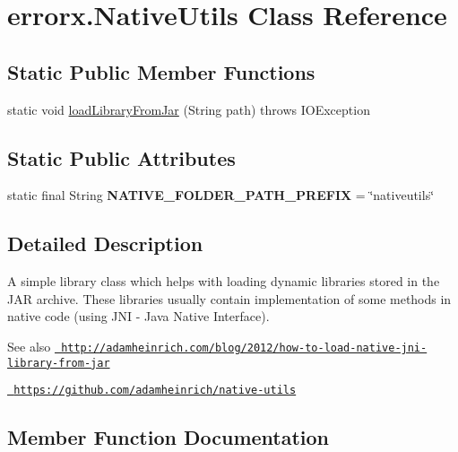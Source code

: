 \hypertarget{classerrorx_1_1_native_utils}{}\section{errorx.\+Native\+Utils Class Reference}
\label{classerrorx_1_1_native_utils}
\subsection*{Static Public Member Functions}
\begin{DoxyCompactItemize}
\item 
static void \mbox{\hyperlink{classerrorx_1_1_native_utils_a673add9b19469f2d436ed69a12bd1360}{load\+Library\+From\+Jar}} (String path)  throws I\+O\+Exception 
\end{DoxyCompactItemize}
\subsection*{Static Public Attributes}
\begin{DoxyCompactItemize}
\item 
\mbox{\label{classerrorx_1_1_native_utils_ae5420a210f1d41fb2d8a00a6883476ea}} 
static final String {\bfseries N\+A\+T\+I\+V\+E\+\_\+\+F\+O\+L\+D\+E\+R\+\_\+\+P\+A\+T\+H\+\_\+\+P\+R\+E\+F\+IX} = \char`\"{}nativeutils\char`\"{}
\end{DoxyCompactItemize}


\subsection{Detailed Description}
A simple library class which helps with loading dynamic libraries stored in the J\+AR archive. These libraries usually contain implementation of some methods in native code (using J\+NI -\/ Java Native Interface).

\begin{DoxySeeAlso}{See also}
\href{http://adamheinrich.com/blog/2012/how-to-load-native-jni-library-from-jar}{\texttt{ http\+://adamheinrich.\+com/blog/2012/how-\/to-\/load-\/native-\/jni-\/library-\/from-\/jar}} 

\href{https://github.com/adamheinrich/native-utils}{\texttt{ https\+://github.\+com/adamheinrich/native-\/utils}} 
\end{DoxySeeAlso}


\subsection{Member Function Documentation}
\mbox{\label{classerrorx_1_1_native_utils_a673add9b19469f2d436ed69a12bd1360}} 
